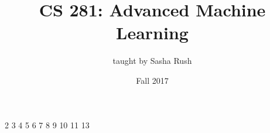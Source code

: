 \documentclass{article}
\begin{document}
\title{CS 281: Advanced Machine Learning}
\date{Fall 2017}
\author{taught by Sasha Rush}
\maketitle

\tableofcontents
\eject

{2}
{3}
{4}
{5}
{6}
{7}
{8}
{9}
{10}
{11}
{13}
\end{document}
